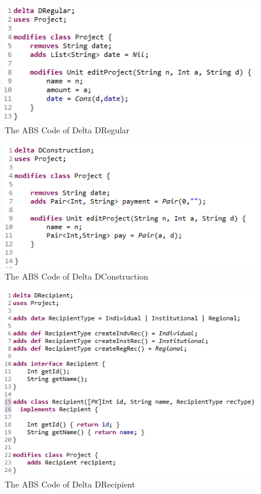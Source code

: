 \documentclass[runningheads,a4paper]{llncs}
\begin{document}
\begin{figure}
	\centering
	\includegraphics[scale=0.7]{code3.png}
	\caption{The ABS Code of Delta DRegular}
	\label{Figure 17}
\end{figure}

\begin{figure}
	\centering
	\includegraphics[scale=0.7]{code4.png}
	\caption{The ABS Code of Delta DConstruction}
	\label{Figure 18}
\end{figure}

\begin{figure}
	\centering
	\includegraphics[scale=0.7]{code5.png}
	\caption{The ABS Code of Delta DRecipient}
	\label{Figure 19}
\end{figure}
\end{document}
